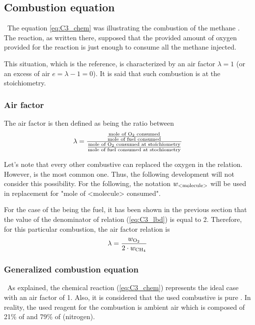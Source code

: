 \subsection{Combustion equation}
\quad\, The equation \ref{eq:C3_chem} was illustrating the combustion of the methane . The reaction, as written there, supposed that the provided amount of oxygen provided for the reaction is just enough to consume all the methane injected. 

This situation, which is the reference, is characterized by an air factor $\lambda = 1$ (or an excess of air $e=\lambda-1=0$). It is said that such combustion is at the stoichiometry.

\subsubsection{Air factor}
The air factor is then defined as being the ratio between
\begin{equation}
\lambda = \frac{\frac{\text{mole of \ce{O2} consumed}}{\text{mole of fuel consumed}}}{\frac{\text{mole of \ce{O2} consumed at stoichiometry}}{\text{mole of fuel consumed at stochiometry}}} \label{eq:C3_lbd}
\end{equation}

Let's note that every other combustive can replaced the oxygen in the relation. However,  is the most common one. Thus, the following development will not consider this possibility.
For the following, the notation $w_{\ce{\text{<molecule>}}}$ will be used in replacement for "mole of <molecule> consumed". 

For the case of the  being the fuel, it has been shown in the previous section that the value of the denominator of relation (\ref{eq:C3_lbd}) is equal to 2. Therefore, for this particular combustion, the air factor relation is 
\begin{equation}
\lambda = \frac{w_{\ce{O2}}}{2\cdot w_{\ce{CH4}}}\label{eq:C3_lbdCH4}
\end{equation}

\subsubsection{Generalized combustion equation}
\quad\, As explained, the chemical reaction (\ref{eq:C3_chem}) represents the ideal case with an air factor of 1. Also, it is considered that the used combustive is pure . In reality, the used reagent for the combustion is ambient air which is composed of 21\% of  and 79\% of  (nitrogen). 

